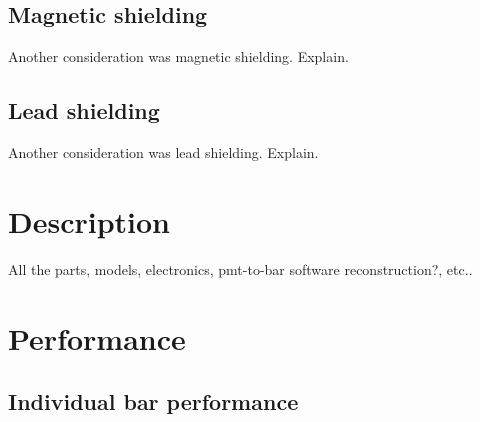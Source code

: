 \documentclass[review]{elsarticle}
\begin{document}
\subsection{Magnetic shielding}
{\color{red}Another consideration was magnetic shielding. Explain.}

\subsection{Lead shielding}
{\color{red}Another consideration was lead shielding. Explain.}


\section{Description}
All the parts, models, electronics, pmt-to-bar software reconstruction?, etc..



\section{Performance}
\subsection{Individual bar performance}
\end{document}
